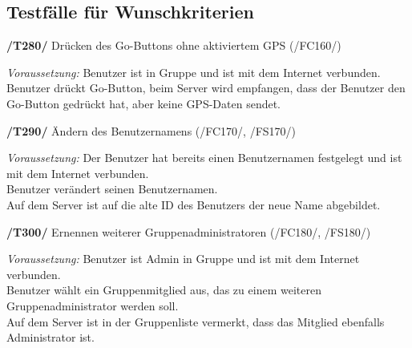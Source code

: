 \subsection{Testfälle für Wunschkriterien}

\textbf{/T280/} Drücken des Go-Buttons ohne aktiviertem GPS (/FC160/)\\
\begin{center}
\vspace{-\parskip}
\begin{minipage}[t]{0.9\textwidth}
\emph{Voraussetzung:} Benutzer ist in Gruppe und ist mit dem Internet verbunden.           \\
Benutzer drückt Go-Button, beim Server wird empfangen, dass der Benutzer den Go-Button
gedrückt hat, aber keine GPS-Daten sendet.                                             \\
\end{minipage}
\end{center}

\textbf{/T290/} Ändern des Benutzernamens (/FC170/, /FS170/)\\
\begin{center}
\vspace{-\parskip}
\begin{minipage}[t]{0.9\textwidth}
\emph{Voraussetzung:} Der Benutzer hat bereits einen Benutzernamen festgelegt und ist mit dem Internet verbunden.\\
Benutzer verändert seinen Benutzernamen.                                                                   \\
Auf dem Server ist auf die alte ID des Benutzers der neue Name abgebildet.                                  \\
\end{minipage}
\end{center}

\textbf{/T300/} Ernennen weiterer Gruppenadministratoren (/FC180/, /FS180/)\\
\begin{center}
\vspace{-\parskip}
\begin{minipage}[t]{0.9\textwidth}
\emph{Voraussetzung:} Benutzer ist Admin in Gruppe und ist mit dem Internet verbunden.\\
Benutzer wählt ein Gruppenmitglied aus, das zu einem weiteren Gruppenadministrator werden soll.\\
Auf dem Server ist in der Gruppenliste vermerkt, dass das Mitglied ebenfalls Administrator ist.\\
\end{minipage}
\end{center}

